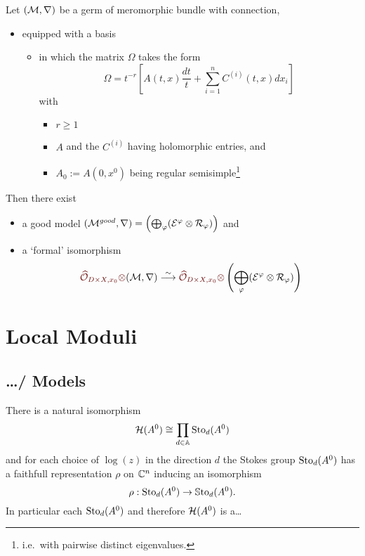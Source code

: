 \begin{thm}
  Let $(\mathcal{M},\nabla)$ be a germ of meromorphic bundle with connection,
  \begin{itemize}
    \item equipped with a basis 
      \begin{itemize}
        \item 
          in which the matrix $\Omega$ takes the form
          \[
            \Omega=t^{-r}\left[A(t,x)\frac{dt}{t}
              +\sum_{i=1}^nC^{(i)}(t,x)dx_i\right]
          \]
        with
        \begin{itemize}
          \item $r\geq1$
          \item $A$ and the $C^{(i)}$ having holomorphic entries, and
          \item $A_0:=A(0,x^0)$ being regular semisimple\footnote{i.e.\ with
            pairwise distinct eigenvalues.}
        \end{itemize}
      \end{itemize}
  \end{itemize}
  Then there exist
  \begin{itemize}
    \item a good model $(\mathcal{M}^{good},\nabla)
      =\left(\bigoplus_\varphi(\mathcal{E}^\varphi\otimes\mathcal{R}_\varphi) \right)$ and
    \item a \textcolor{red!40!black}{`formal'} isomorphism
      \[
        \textcolor{red!40!black}{\hat\cO_{D\times X,x_0}\otimes}(\cM,\nabla)
        \overset{\sim}{\longrightarrow}
      \textcolor{red!40!black}{\hat\cO_{D\times X,x_0}\otimes}
        \left(\bigoplus_\phi(\cE^\phi\otimes\cR_\phi) \right)
      \]
  \end{itemize}
\end{thm}


\section{Local Moduli}
\subsection{\dots / Models}

\begin{paracol}{2} %
  \begin{thm}
    There is a natural isomorphism
    \[
      \mathcal{H}(A^0)\cong\prod_{d\in\mathbb{A}}\operatorname{Sto}_d(A^0)
    \]
    and for each choice of $\log(z)$ in the direction $d$ the Stokes group
    $\operatorname{Sto}_d(A^0)$ has a faithfull representation $\rho$ on $\mathbb{C}^n$ inducing an
    isomorphism
    \[
      \rho:\operatorname{Sto}_d(A^0)\to\operatorname{\mathbb{S}to}_d(A^0).
    \]
    In particular each $\operatorname{Sto}_d(A^0)$ and therefore $\mathcal{H}(A^0)$ is a\dots
  \end{thm}

  \switchcolumn{} %
\end{paracol} %


